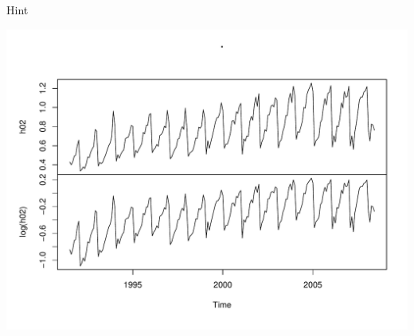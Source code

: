 \documentclass[11pt,ignorenonframetext,]{beamer}
\newenvironment{Shaded}{}{}
\newcommand{\KeywordTok}[1]{\textcolor[rgb]{0.00,0.44,0.13}{\textbf{#1}}}
\newcommand{\StringTok}[1]{\textcolor[rgb]{0.25,0.44,0.63}{#1}}
\newcommand{\OperatorTok}[1]{\textcolor[rgb]{0.40,0.40,0.40}{#1}}
\newcommand{\NormalTok}[1]{#1}
\let\oldShaded\Shaded
\let\endoldShaded\endShaded
\renewenvironment{Shaded}{\footnotesize\begin{spacing}{0.9}\oldShaded}{\endoldShaded\end{spacing}}
\begin{document}
\begin{frame}[fragile]{Hint}

\begin{Shaded}
\end{Shaded}

\includegraphics{Lec11_files/figure-beamer/unnamed-chunk-31-1.pdf}

\end{frame}
\end{document}
